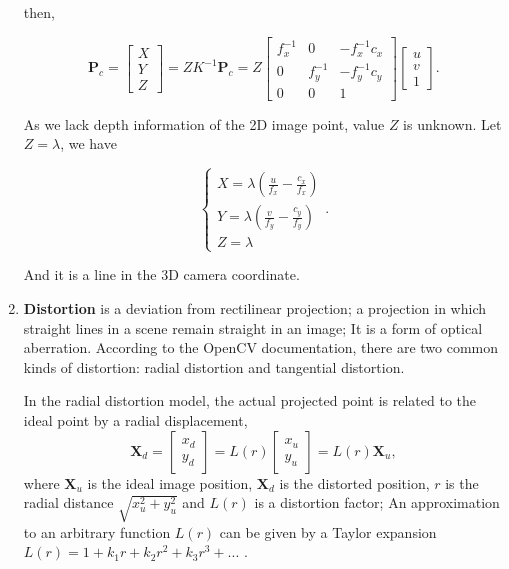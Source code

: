 \documentclass{article}
\begin{document}
\begin{enumerate}
then,

$$
\boldsymbol P_c = \begin{bmatrix} X \\ Y \\ Z \end{bmatrix} = ZK^{-1}\boldsymbol P_c = Z \begin{bmatrix} f_x^{-1} & 0 & -f_x^{-1}c_x \\ 0 & f_y^{-1} & -f_y^{-1}c_y \\ 0 & 0 & 1 \end{bmatrix} \begin{bmatrix} u \\ v \\ 1 \end{bmatrix}.
$$

As we lack depth information of the 2D image point, value $Z$ is unknown. Let $Z = \lambda$, we have

$$\begin{cases}
X = \lambda (\frac u{f_x} - \frac {c_x}{f_x}) \\
Y = \lambda(\frac v{f_y} - \frac {c_y}{f_y}) \\
Z = \lambda
\end{cases}.$$

And it is a line in the 3D camera coordinate.

\item \textbf{Distortion} is a deviation from rectilinear projection; a projection in which straight lines in a scene remain straight in an image; It is a form of optical aberration\cite{ref4}. According to the OpenCV documentation, there are two common kinds of distortion: radial distortion and tangential distortion\cite{ref5}.

In the radial distortion model, the actual projected point is related to the ideal point by a radial displacement,
$$
\boldsymbol X_d = \begin{bmatrix} x_d \\ y_d \end{bmatrix} = L(r) \begin{bmatrix} x_u \\ y_u \end{bmatrix} = L(r) \boldsymbol X_u ,
$$
where  $\boldsymbol X_u$ is the ideal image position, $\boldsymbol X_d$ is the distorted position, $r$ is the radial distance $\sqrt{x_u^2 + y_u^2}$ and  $L(r)$ is a distortion factor; An approximation to an arbitrary function $L(r)$ can be given by a Taylor expansion $L(r) = 1 + k_1r + k_2r^2 + k_3r^3 + ...$ \cite{ref6}.


\end{enumerate}
\end{document}
